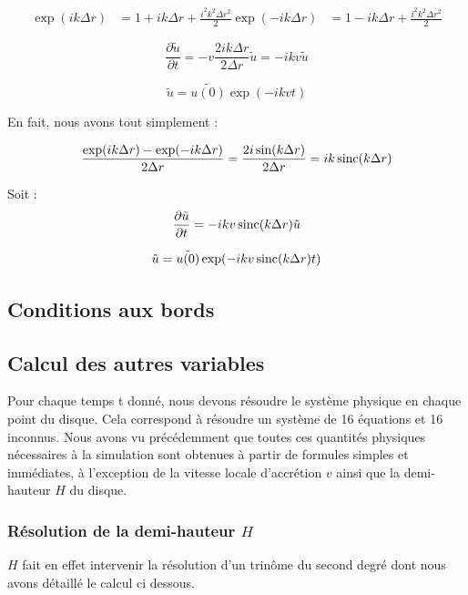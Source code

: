 \begin{align}
    \exp(ik\Delta{r}) &= 1 + ik\Delta{r} + \frac{i^2 k^2 \Delta{r}^2}{2}
    \exp(-ik\Delta{r}) &= 1 - ik\Delta{r} + \frac{i^2 k^2 \Delta{r}^2}{2}
\end{align}

\begin{equation}
    \frac{\partial \tilde{u}}{\partial t} = - v \frac{2ik\Delta{r}}{2\Delta{r}} \tilde{u} = - i k v \tilde{u}
\end{equation}

\begin{equation}
    \tilde{u} = \tilde{u(0)} \exp(-i k v t)
\end{equation}

En fait, nous avons tout simplement :

\begin{equation}
    \frac{\exp(ik\Delta{r}) - \exp(-ik\Delta{r})}{2 \Delta{r}} = \frac{2 i \sin(k\Delta{r})}{2 \Delta{r}} = i k \operatorname{sinc}(k\Delta{r})
\end{equation}

Soit :
\begin{equation}
    \frac{\partial \tilde{u}}{\partial t} = - i k v \operatorname{sinc}(k\Delta{r}) \tilde{u}
\end{equation}

\begin{equation}
    \tilde{u} = \tilde{u(0)} \exp(-i k v \operatorname{sinc}(k \Delta{r}) t)
\end{equation}

\subsection{Conditions aux bords}

\subsection{Calcul des autres variables}

Pour chaque temps t donné, nous devons résoudre le système physique en chaque point du disque. Cela correspond à résoudre un système de 16 équations et 16 inconnus. Nous avons vu précédemment que toutes ces quantités physiques nécessaires à  la simulation sont obtenues à  partir de formules simples et immédiates, à  l'exception de la vitesse locale d'accrétion $v$ ainsi que la demi-hauteur $H$ du disque.
\subsubsection{Résolution de la demi-hauteur $H$}
  $H$ fait en effet intervenir la résolution d'un trinôme du second degré dont nous avons détaillé le calcul ci dessous. \\

